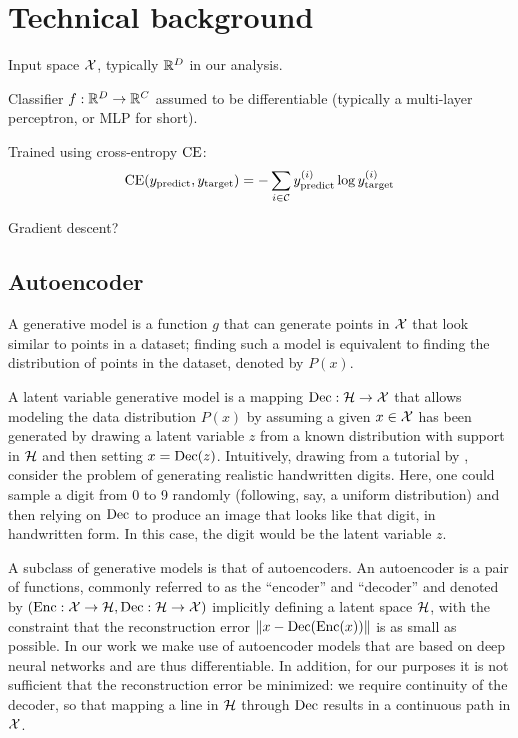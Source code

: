 \documentclass[../main.tex]{subfiles}
\begin{document}
\chapter{Technical background}
\label{ch:background}

Input space $\mathcal{X}$, typically $\mathbb{R}^D$ in our analysis.

Classifier $f: \mathbb{R}^D \to \mathbb{R}^C$ assumed to be differentiable (typically a multi-layer perceptron, or MLP for short).

Trained using cross-entropy $\text{CE}$:
\begin{equation}
    \text{CE}(y_\text{predict}, y_{\mathrm{target}}) = - \sum_{i \in \mathcal{C}} y_\text{predict}^{(i)} \log y_{\mathrm{target}}^{(i)}
\end{equation}

Gradient descent?


\section{Autoencoder}

A generative model is a function $g$ that can generate points in $\mathcal{X}$ that look similar to points in a dataset; finding such a model is equivalent to finding the distribution of points in the dataset, denoted by $P(x)$.

A latent variable generative model is a mapping $\operatorname{Dec}: \mathcal{H} \to \mathcal{X}$ that allows modeling the data distribution $P(x)$ by assuming a given $x \in \mathcal{X}$ has been generated by drawing a latent variable $z$ from a known distribution with support in $\mathcal{H}$ and then setting $x = \operatorname{Dec}(z)$.
Intuitively, drawing from a tutorial by \citeauthor{doerschTutorial2021} \cite{doerschTutorial2021}, consider the problem of generating realistic handwritten digits.
Here, one could sample a digit from 0 to 9 randomly (following, say, a uniform distribution) and then relying on $\operatorname{Dec}$ to produce an image that looks like that digit, in handwritten form. In this case, the digit would be the latent variable $z$.

A subclass of generative models is that of autoencoders.
An autoencoder is a pair of functions, commonly referred to as the ``encoder'' and ``decoder'' and denoted by $(\operatorname{Enc}: \mathcal{X} \to \mathcal{H}, \operatorname{Dec}: \mathcal{H} \to \mathcal{X})$ implicitly defining a latent space $\mathcal{H}$, with the constraint that the reconstruction error $\left\lVert x - \operatorname{Dec}(\operatorname{Enc}(x))\right\rVert$ is as small as possible.
In our work we make use of autoencoder models that are based on deep neural networks and are thus differentiable.
In addition, for our purposes it is not sufficient that the reconstruction error be minimized: we require continuity of the decoder, so that mapping a line in $\mathcal{H}$ through $\operatorname{Dec}$ results in a continuous path in $\mathcal{X}$.
\end{document}
